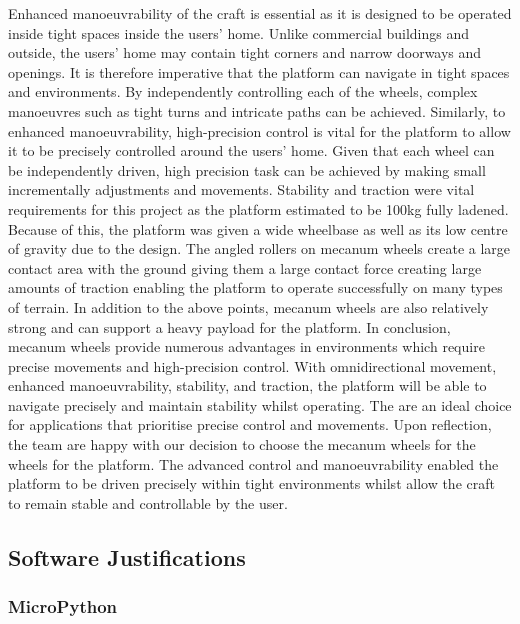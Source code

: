 \documentclass [12pt]{article}
\begin{document}
Enhanced manoeuvrability of the craft is essential as it is designed to be operated inside tight spaces inside the users’ home. Unlike commercial buildings and outside, the users’ home may contain tight corners and narrow doorways and openings. It is therefore imperative that the platform can navigate in tight spaces and environments.  By independently controlling each of the wheels, complex manoeuvres such as tight turns and intricate paths can be achieved.
Similarly, to enhanced manoeuvrability, high-precision control is vital for the platform to allow it to be precisely controlled around the users’ home. Given that each wheel can be independently driven, high precision task can be achieved by making small incrementally adjustments and movements.
Stability and traction were vital requirements for this project as the platform estimated to be 100kg fully ladened. Because of this, the platform was given a wide wheelbase as well as its low centre of gravity due to the design. The angled rollers on mecanum wheels create a large contact area with the ground giving them a large contact force creating large amounts of traction enabling the platform to operate successfully on many types of terrain.
In addition to the above points, mecanum wheels are also relatively strong and can support a heavy payload for the platform.
In conclusion, mecanum wheels provide numerous advantages in environments which require precise movements and high-precision control. With omnidirectional movement, enhanced manoeuvrability, stability, and traction, the platform will be able to navigate precisely and maintain stability whilst operating. The are an ideal choice for applications that prioritise precise control and movements.
Upon reflection, the team are happy with our decision to choose the mecanum wheels for the wheels for the platform. The advanced control and manoeuvrability enabled the platform to be driven precisely within tight environments whilst allow the craft to remain stable and controllable by the user.


\subsection{Software Justifications}

\subsubsection{MicroPython}
\end{document}
